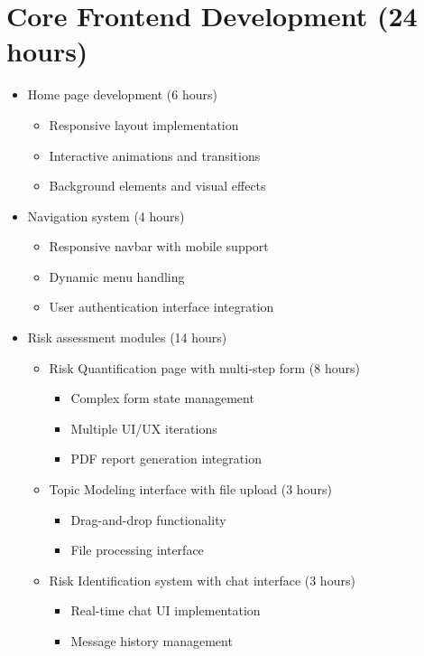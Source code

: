 \documentclass[11pt]{article}
\begin{document}
\section{Core Frontend Development (24 hours)}
\begin{itemize}[leftmargin=*]
  \item Home page development (6 hours)
  \begin{itemize}
    \item Responsive layout implementation
    \item Interactive animations and transitions
    \item Background elements and visual effects
  \end{itemize}
  \item Navigation system (4 hours)
  \begin{itemize}
    \item Responsive navbar with mobile support
    \item Dynamic menu handling
    \item User authentication interface integration
  \end{itemize}
  \item Risk assessment modules (14 hours)
  \begin{itemize}
    \item Risk Quantification page with multi-step form (8 hours)
    \begin{itemize}
      \item Complex form state management
      \item Multiple UI/UX iterations
      \item PDF report generation integration
    \end{itemize}
    \item Topic Modeling interface with file upload (3 hours)
    \begin{itemize}
      \item Drag-and-drop functionality
      \item File processing interface
    \end{itemize}
    \item Risk Identification system with chat interface (3 hours)
    \begin{itemize}
      \item Real-time chat UI implementation
      \item Message history management
    \end{itemize}
  \end{itemize}
\end{itemize}
\end{document}

